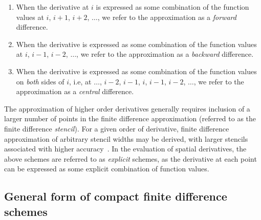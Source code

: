 \begin{enumerate}
    \item When the derivative at $i$ is expressed
        as some combination of the function values
        at $i$, $i+1$, $i+2$, $\hdots$,
        we refer to the approximation as a
        \emph{forward} difference.
        
    \item When the derivative is expressed as
        some combination of the function values
        at $i$, $i-1$, $i-2$, $\hdots$,
        we refer to the approximation as a
        \emph{backward} difference.

    \item When the derivative is expressed as
        some combination of the function values
        on \emph{both} sides of $i$, i.e,
        at $\hdots$, $i-2$, $i-1$, $i$, $i-1$, $i-2$, $\hdots$,
        we refer to the approximation as a
        \emph{central} difference.
\end{enumerate}
%
The approximation of higher order derivatives generally requires
inclusion of a larger number of points in the
finite difference approximation
(referred to as the finite difference \emph{stencil}).
For a given order of derivative,
finite difference approximation of arbitrary stencil widths
may be derived,
with larger stencils associated with higher accuracy~\cite{fornberg1988generation}.
In the evaluation of spatial derivatives,
the above schemes are referred to as \emph{explicit}
schemes, as the derivative at each point
can be expressed as some explicit combination of function values.

\subsection{General form of compact finite difference schemes}
\label{subsec:gen-form-compact}

